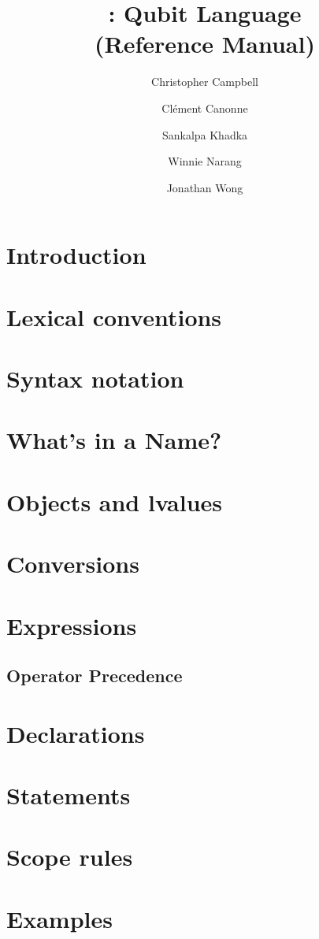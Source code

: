 \documentclass[11pt]{article}
\title{\QL: Qubit Language\\ \Large(Reference Manual)}
\author{
  Christopher Campbell
  \and Cl\'ement Canonne
  \and Sankalpa Khadka
  \and Winnie Narang
  \and Jonathan Wong
}
\begin{document}
\maketitle
\tableofcontents
\clearpage

\section{Introduction}
\section{Lexical conventions}

\section{Syntax notation}
\section{What's in a Name?}
\section{Objects and lvalues}
\section{Conversions}
\section{Expressions}
\subsection{Operator Precedence}

\section{Declarations}

\section{Statements}
\section{Scope rules}

\section{Examples}

\end{document}
